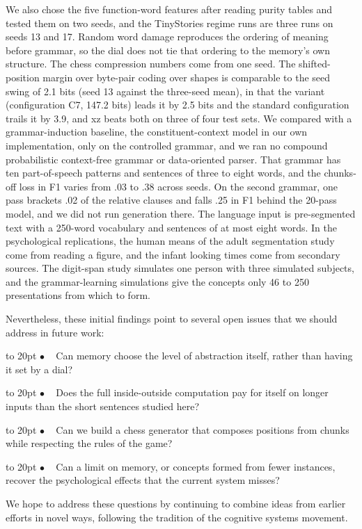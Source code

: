 \documentclass[11pt,letterpaper]{article}
\def\texitem#1{\par\noindent\hangindent 20pt\hbox to 20pt {\hss #1 ~}\ignorespaces}
\def\bull{\texitem{$\bullet$}}
\begin{document}
We also chose the five function-word features after reading purity tables and tested
them on two seeds, and the TinyStories regime runs are three runs on seeds 13 and 17.
Random word damage reproduces the ordering of meaning before grammar, so the dial does
not tie that ordering to the memory's own structure. The chess compression numbers come
from one seed. The shifted-position margin over byte-pair coding over shapes is
comparable to the seed swing of 2.1 bits (seed 13 against the three-seed mean), in that
the variant (configuration C7, 147.2 bits) leads it by 2.5 bits and the standard
configuration trails it by 3.9, and xz beats both on three of four test sets. We compared
with a grammar-induction baseline, the constituent-context model in our own
implementation, only on the controlled grammar, and we ran no compound probabilistic
context-free grammar or data-oriented parser. That grammar has ten
part-of-speech patterns and sentences of three to eight words, and the chunks-off loss in F1
varies from .03 to .38 across seeds. On the second grammar, one pass brackets .02 of the
relative clauses and falls .25 in F1 behind the 20-pass model, and we did not run generation there. The language input is pre-segmented text
with a 250-word vocabulary and sentences of at most eight words. In the psychological
replications, the human means of the adult segmentation study come from reading a
figure, and the infant looking times come from secondary sources. The digit-span study
simulates one person with three simulated subjects, and the grammar-learning
simulations give the concepts only 46 to 250 presentations from which to form.

Nevertheless, these initial findings point to several open issues that we should
address in future work:

\vskip 0.05in

\bull
Can memory choose the level of abstraction itself, rather than having it set by a dial?

\bull
Does the full inside-outside computation pay for itself on longer inputs than the short
sentences studied here?

\bull
Can we build a chess generator that composes positions from chunks while respecting the
rules of the game?

\bull
Can a limit on memory, or concepts formed from fewer instances, recover the
psychological effects that the current system misses?

\vskip 0.05in
\noindent
We hope to address these questions by continuing to combine ideas from earlier efforts
in novel ways, following the tradition of the cognitive systems movement.
\end{document}
